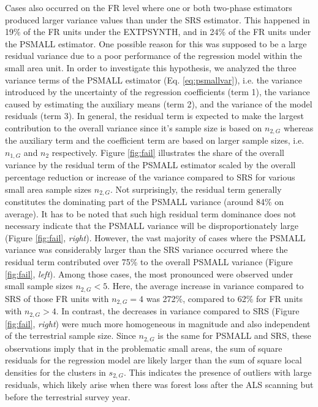 \documentclass[remotesensing,article,submit,moreauthors,pdftex,10pt,a4paper]{mdpi}
\newcommand{\psmall}{PSMALL}
\newcommand{\extpsynth}{EXTPSYNTH}
\begin{document}
Cases also occurred on the FR level where one or both two-phase estimators produced larger variance values than under the SRS estimator. This happened in 19\% of the FR units under the \extpsynth{}, and in 24\% of the FR units under the \psmall{} estimator. One possible reason for this was supposed to be a large residual variance due to a poor performance of the regression model within the small area unit. In order to investigate this hypothesis, we analyzed the three variance terms of the \psmall{} estimator (Eq. \ref{eq:psmallvar}), i.e. the variance introduced by the uncertainty of the regression coefficients (term 1), the variance caused by estimating the auxiliary means (term 2), and the variance of the model residuals (term 3). In general, the residual term is expected to make the largest contribution to the overall variance since it's sample size is based on $n_{2,G}$ whereas the auxiliary term and the coefficient term are based on larger sample sizes, i.e. $n_{1,G}$ and $n_2$ respectively. Figure \ref{fig:fail} illustrates the share of the overall variance by the residual term of the \psmall{} estimator scaled by the overall percentage reduction or increase of the variance compared to SRS for various small area sample sizes $n_{2,G}$. Not surprisingly, the residual term generally constitutes the dominating part of the \psmall{} variance (around 84\% on average). It has to be noted that such high residual term dominance does not necessary indicate that the \psmall{} variance will be disproportionately large (Figure \ref{fig:fail}, \textit{right}). However, the vast majority of cases where the \psmall{} variance was considerably larger than the SRS variance occurred where the residual term contributed over 75\% to the overall \psmall{} variance (Figure \ref{fig:fail}, \textit{left}). Among those cases, the most pronounced were observed under small sample sizes $n_{2,G} < 5$. Here, the average increase in variance compared to SRS of those FR units with $n_{2,G}=4$ was 272\%, compared to 62\% for FR units with $n_{2,G} > 4$. In contrast, the decreases in variance compared to SRS (Figure \ref{fig:fail}, \textit{right}) were much more homogeneous in magnitude and also independent of the terrestrial sample size. Since $n_{2,G}$ is the same for \psmall{} and SRS, these observations imply that in the problematic small areas, the sum of square residuals for the regression model are likely larger than the sum of square local densities for the clusters in $s_{2,G}$. This indicates the presence of outliers with large residuals, which likely arise when there was forest loss after the ALS scanning but before the terrestrial survey year. %
\end{document}
